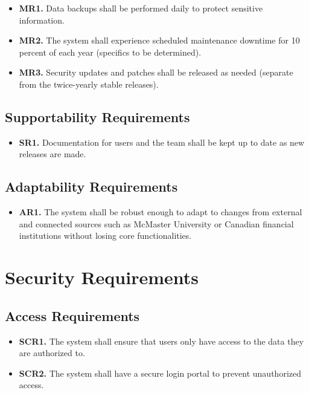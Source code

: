 \documentclass[12pt]{article}
\begin{document}
\label{MR}

\begin{itemize}
    \item \textbf{MR1.} Data backups shall be performed daily to protect sensitive information.
    \item \textbf{MR2.} The system shall experience scheduled maintenance downtime for 10 percent of each year (specifics to be determined).
    \item \textbf{MR3.} Security updates and patches shall be released as needed (separate from the twice-yearly stable releases).
\end{itemize}

\subsection{Supportability Requirements}

\label{SR}

\begin{itemize}
    \item \textbf{SR1.} Documentation for users and the team shall be kept up to date as new releases are made.
\end{itemize}

\subsection{Adaptability Requirements}

\label{AR}

\begin{itemize}
    \item \textbf{AR1.} The system shall be robust enough to adapt to changes from external and connected sources such as McMaster University or Canadian financial institutions without losing core functionalities.
\end{itemize}

\section{Security Requirements}
\subsection{Access Requirements}

\label{SCR}

\begin{itemize}
    \item \textbf{SCR1.} The system shall ensure that users only have access to the data they are authorized to.
    \item \textbf{SCR2.} The system shall have a secure login portal to prevent unauthorized access.
\end{itemize}
\end{document}
